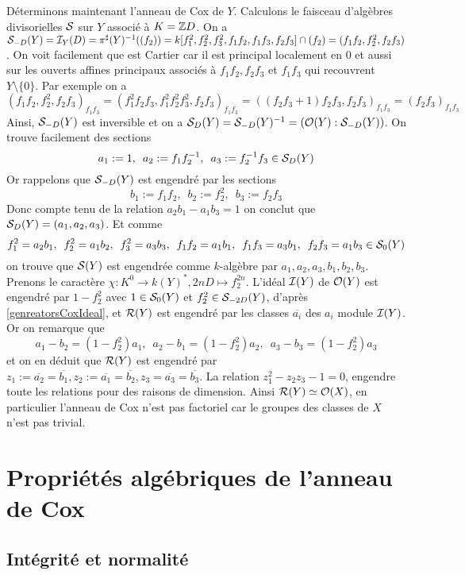 \begin{ex}
Déterminons maintenant l'anneau de Cox de $Y$. Calculons le faisceau d'algèbres divisorielles $\mathcal{S}$ sur $Y$ associé à $K=\mathbb{Z} D$. On a $\mathcal{S}_{-D}(Y)=\mathcal{I}_Y(D)=\pi^{\sharp}(Y)^{-1}((f_2))=k[f_1^2,f_2^2,f_3^2,f_1f_2,f_1f_3,f_2f_3]\cap (f_2)=(f_1f_2,f_2^2,f_2f_3)$. On voit facilement que est Cartier car il est principal localement en $0$ et aussi sur les ouverts affines principaux associés à $f_1f_2, f_2f_3$ et $f_1f_3$ qui recouvrent $Y\setminus \lbrace 0\rbrace$. Par exemple on a 
$$(f_1f_2,f_2^2,f_2f_3)_{f_1f_3}=(f_1^2f_2f_3,f_1^2f_2^2f_3^2,f_2f_3)_{f_1f_3}=((f_2f_3+1)f_2f_3,f_2f_3)_{f_1f_3}=(f_2f_3)_{f_1f_3}$$
Ainsi, $\mathcal{S}_{-D}(Y)$ est inversible et on a $\mathcal{S}_{D}(Y)=\mathcal{S}_{-D}(Y)^{-1}=(\mathcal{O}(Y):\mathcal{S}_{-D}(Y))$. On trouve facilement des sections 
$$a_1:=1,\,\,\,a_2:=f_1f_2^{-1},\,\,\,a_3:=f_2^{-1}f_3\in \mathcal{S}_D(Y)$$
Or rappelons que $\mathcal{S}_{-D}(Y)$ est engendré par les sections
$$b_1:=f_1f_2,\,\,\,b_2:=f_2^2,\,\,\,b_3:=f_2f_3$$
Donc compte tenu de la relation $a_2b_1-a_1b_3=1$ on conclut que $ \mathcal{S}_D(Y)=(a_1,a_2,a_3)$. Et comme
$$f_1^2=a_2b_1,\,\,\,f_2^2=a_1b_2,\,\,\,f_3^2=a_3b_3,\,\,\,f_1f_2=a_1b_1,\,\,\,f_1f_3=a_3b_1,\,\,\,f_2f_3=a_1b_3\in\mathcal{S}_0(Y)$$
on trouve que $\mathcal{S}(Y)$ est engendrée comme $k$-algèbre par $a_1,a_2,a_3,b_1,b_2,b_3$. Prenons le caractère $\chi:K^0\rightarrow k(Y)^*,2nD\mapsto f_2^{2n}$. L'idéal $\mathcal{I}(Y)$ de $\mathcal{O}(Y)$ est engendré par $1-f_2^2$ avec $1\in \mathcal{S}_0(Y)$ et $f_2^2\in \mathcal{S}_{-2D}(Y)$, d'après \ref{genreatorsCoxIdeal}, et $\mathcal{R}(Y)$ est engendré par les classes $\overline{a_i}$ des $a_i$ module $\mathcal{I}(Y)$. Or on remarque que
$$a_1-b_2=(1-f_2^2)a_1,\,\,\,a_2-b_1=(1-f_2^2)a_2,\,\,\,a_3-b_3=(1-f_2^2)a_3$$
et on en déduit que $\mathcal{R}(Y)$ est engendré par $z_1:=\overline{a_2}=\overline{b_1},z_2:=\overline{a_1}=\overline{b_2},z_3=\overline{a_3}=\overline{b_3}$. La relation $z_1^2-z_2z_3-1=0$, engendre toute les relations pour des raisons de dimension. Ainsi $\mathcal{R}(Y)\simeq \mathcal{O}(X)$, en particulier l'anneau de Cox n'est pas factoriel car le groupes des classes de $X$ n'est pas trivial.

\end{ex}

\section{Propriétés algébriques de l'anneau de Cox} 

\subsection{Intégrité et normalité}

